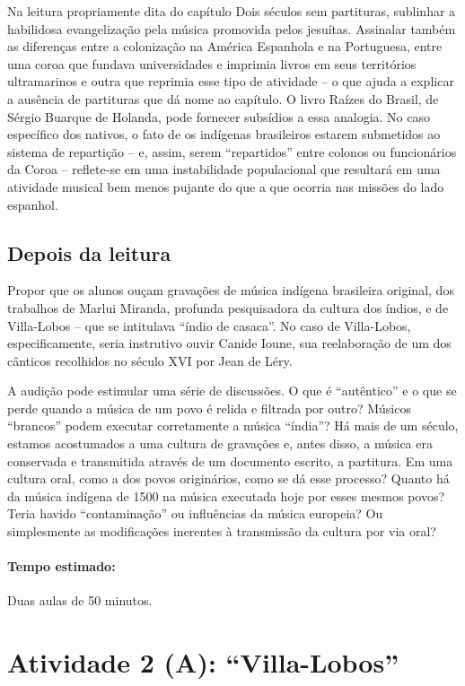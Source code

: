 \documentclass[11pt]{extarticle}
\begin{document}
Na leitura propriamente dita do capítulo Dois séculos sem
partituras, sublinhar a habilidosa evangelização pela música promovida pelos
jesuítas. Assinalar também as diferenças entre a colonização na América
Espanhola e na Portuguesa, entre uma coroa que fundava universidades e imprimia
livros em seus territórios ultramarinos e outra que reprimia esse tipo de
atividade – o que ajuda a explicar a ausência de partituras que dá nome ao
capítulo. O livro Raízes do Brasil, de Sérgio Buarque de Holanda, pode fornecer
subsídios a essa analogia. No caso específico dos nativos, o fato de os
indígenas brasileiros estarem submetidos ao sistema de repartição – e, assim,
serem “repartidos” entre colonos ou funcionários da Coroa – reflete-se em uma
instabilidade populacional que resultará em uma atividade musical bem menos
pujante do que a que ocorria nas missões do lado espanhol. 

\subsection{Depois da leitura}


Propor que os alunos ouçam gravações de música indígena brasileira original,
dos trabalhos de Marlui Miranda, profunda pesquisadora da cultura dos índios, e
de Villa-Lobos – que se intitulava “índio de casaca”. No caso de Villa-Lobos,
especificamente, seria instrutivo ouvir Canide Ioune, sua reelaboração de um
dos cânticos recolhidos no século XVI por Jean de Léry.


A audição pode estimular uma série de discussões. O que é “autêntico”
e o que se perde quando a música de um povo é relida e filtrada por outro?
Músicos “brancos” podem executar corretamente a música “índia”? Há mais de um
século, estamos acostumados a uma cultura de gravações e, antes disso, a música
era conservada e transmitida através de um documento escrito, a partitura. Em
uma cultura oral, como a dos povos originários, como se dá esse processo?
Quanto há da música indígena de 1500 na música executada hoje por esses mesmos
povos? Teria havido “contaminação” ou influências da música europeia? Ou
simplesmente as modificações inerentes à transmissão da cultura por via oral?

\paragraph{Tempo estimado:} Duas aulas de 50 minutos.




\section{Atividade 2 (A): ``Villa-Lobos''}
\end{document}
